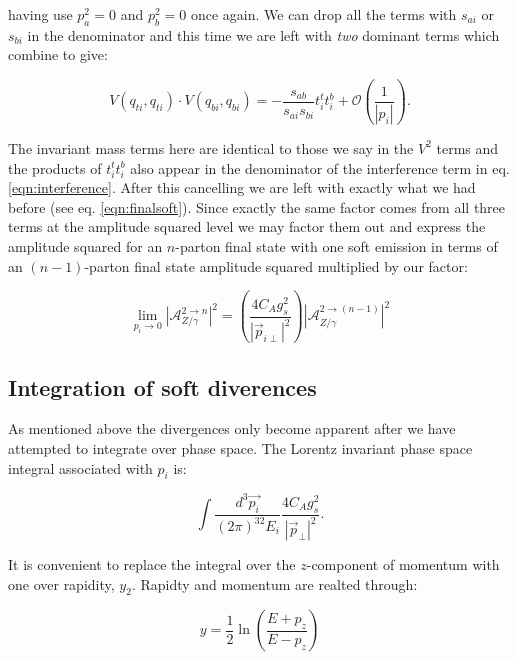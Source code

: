 		having use $p_a^2=0$ and $p_b^2=0$ once again.  We can drop all the terms with $s_{ai}$ or
		$s_{bi}$ in the denominator and this time we are left with \emph{two} dominant terms which
		combine to give:

		\begin{equation}
			V(q_{ti}, q_{ti})\cdot V(q_{bi}, q_{bi}) = -\frac{s_{ab}}{s_{ai}s_{bi}}t_i^tt_i^b +
				\mathcal{O}\left(\frac{1}{|p_i|}\right).
		\end{equation}

		The invariant mass terms here are identical to those we say in the $V^2$ terms and the products of
		$t_i^tt_i^b$ also appear in the denominator of the interference term in eq. \eqref{eqn:interference}.
		After this cancelling we are left with exactly what we had before (see eq. \eqref{eqn:finalsoft}).
		Since exactly the same factor comes from all three terms at the amplitude squared level we may factor
		them out and express the amplitude squared for an $n$-parton final state with one soft emission in
		terms of an $(n-1)$-parton final state amplitude squared multiplied by our factor:

		\begin{equation}
			\lim_{p_i\rightarrow0} |\mathcal{A}_{Z/\gamma}^{2\rightarrow n}|^2 = \left(\frac{4C_Ag_s^2}{|\vec{p}_{i\perp}|^2}\right)
				|\mathcal{A}_{Z/\gamma}^{2\rightarrow (n-1)}|^2
		\end{equation}

	\subsection{Integration of soft diverences}
	\label{sub:subsection_name}

		As mentioned above the divergences only become apparent after we have attempted to integrate over
		phase space.  The Lorentz invariant phase space integral associated with $p_i$ is:

		\begin{equation}
			\int\frac{d^3\vec{p_i}}{(2\pi)^32E_i}\frac{4C_Ag_s^2}{|\vec{p}_\perp|^2}.
		\end{equation}

		It is convenient to replace the integral over the $z$-component of momentum with one over rapidity,
		$y_2$.  Rapidty and momentum are realted through:

		\begin{equation}
			y = \frac12\ln\left(\frac{E + p_z}{E - p_z}\right)
		\end{equation}


